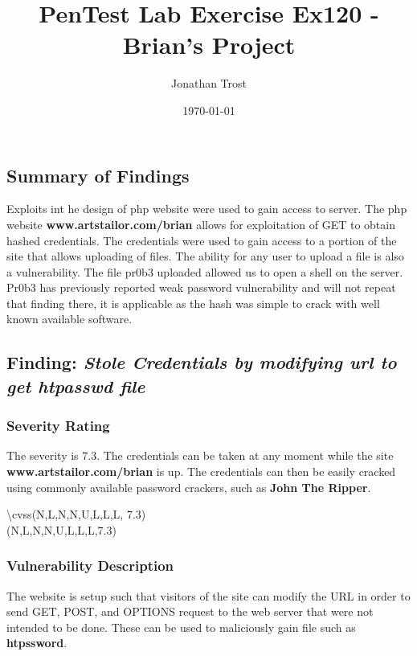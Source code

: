 \documentclass[notitlepage]{article}
\begin{document}
	
	
	\title{PenTest Lab Exercise Ex120 - Brian's Project}
	\author{Jonathan Trost}
	\date{\isodate\today}
	
	\maketitle
	
	\tableofcontents
	
	\newpage
	
	\subsection{Summary of Findings}
	\indent Exploits int he design of php website were used to gain access to server. The php website \textbf{www.artstailor.com/brian} allows for exploitation of GET to obtain hashed credentials.  The credentials were used to gain access to a portion of the site that allows uploading of files. The ability for any user to upload a file is also a vulnerability.  The file pr0b3 uploaded allowed us to open a shell on the server. Pr0b3 has previously reported weak password vulnerability and will not repeat that finding there, it is applicable as the hash was simple to crack with well known available software. 
	
	\subsection{Finding: \emph{Stole Credentials by modifying url to get htpasswd file}}
	
	\subsubsection{Severity Rating}
	\indent The severity is 7.3. The credentials can be taken at any moment while the site \textbf{www.artstailor.com/brian} is up. The credentials can then be easily cracked using commonly available password crackers, such as \textbf{John The Ripper}.
	
	\textbackslash cvss(N,L,N,N,U,L,L,L, 7.3)\\
	\cvss(N,L,N,N,U,L,L,L,7.3) \\
	
	\subsubsection{Vulnerability Description}
	\indent The website is setup such that visitors of the site can modify the URL in order to send GET, POST, and OPTIONS request to the web server that were not intended to be done.  These can be used to maliciously gain file such as \textbf{htpssword}.  \\
	
\end{document}
